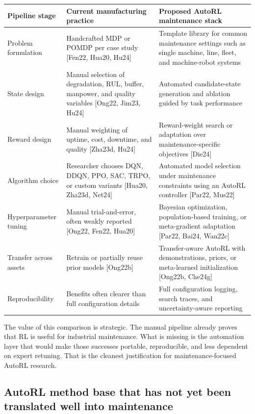 \begin{table}[htbp]
\centering
\small
\begin{tabular}{p{} p{} p{}}
\hline
Pipeline stage & Current manufacturing practice & Proposed AutoRL maintenance stack \\
\hline
Problem formulation & Handcrafted MDP or POMDP per case study [Fen22, Hua20, Hu24] & Template library for common maintenance settings such as single machine, line, fleet, and machine-robot systems \\
State design & Manual selection of degradation, RUL, buffer, manpower, and quality variables [Ong22, Jim23, Hu24] & Automated candidate-state generation and ablation guided by task performance \\
Reward design & Manual weighting of uptime, cost, downtime, and quality [Zha23d, Hu24] & Reward-weight search or adaptation over maintenance-specific objectives [Die24] \\
Algorithm choice & Researcher chooses DQN, DDQN, PPO, SAC, TRPO, or custom variants [Hua20, Zha23d, Net24] & Automated model selection under maintenance constraints using an AutoRL controller [Par22, Mus22] \\
Hyperparameter tuning & Manual trial-and-error, often weakly reported [Ong22, Fen22, Hua20] & Bayesian optimization, population-based training, or meta-gradient adaptation [Par22, Bai24, Wan22c] \\
Transfer across assets & Retrain or partially reuse prior models [Ong22b] & Transfer-aware AutoRL with demonstrations, priors, or meta-learned initialization [Ong22b, Che24g] \\
Reproducibility & Benefits often clearer than full configuration details & Full configuration logging, search traces, and uncertainty-aware reporting \\
\hline
\end{tabular}
\end{table}

The value of this comparison is strategic. The manual pipeline already proves that RL is useful for industrial maintenance. What is missing is the automation layer that would make those successes portable, reproducible, and less dependent on expert retuning. That is the cleanest justification for maintenance-focused AutoRL research.

\subsection{AutoRL method base that has not yet been translated well into maintenance}

